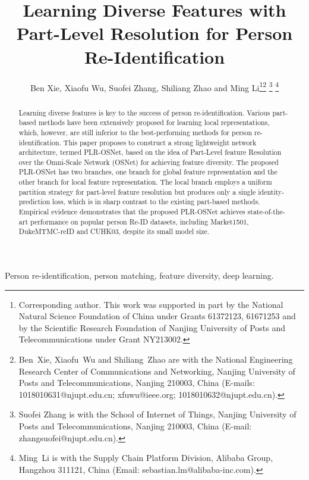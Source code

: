 \documentclass[journal]{IEEEtran}
\begin{document}
\title{Learning Diverse Features with Part-Level Resolution for Person Re-Identification}
\author{Ben Xie, Xiaofu Wu, Suofei Zhang, Shiliang Zhao and Ming Li\thanks{Corresponding author. This work was supported in part by the National Natural Science Foundation of China under Grants 61372123, 61671253 and by the Scientific Research Foundation of Nanjing University of Posts and Telecommunications under Grant NY213002.}\thanks{Ben~Xie, Xiaofu~Wu and Shiliang~Zhao are with the National Engineering Research Center of Communications and Networking, Nanjing University of Posts and Telecommunications, Nanjing 210003, China (E-mails: 1018010631@njupt.edu.cn; xfuwu@ieee.org; 1018010632@njupt.edu.cn).}
\thanks{Suofei Zhang is with the School of Internet of Things, Nanjing University of Posts and Telecommunications, Nanjing 210003, China (E-mail: zhangsuofei@njupt.edu.cn).}
\thanks{Ming~Li is with the Supply Chain Platform Division, Alibaba Group, Hangzhou 311121, China
(Email: sebastian.lm@alibaba-inc.com).}}

\maketitle

\begin{abstract}
   Learning diverse features is key to the success of person re-identification. Various part-based methods have been extensively proposed for learning local representations, which, however, are still inferior to the best-performing methods for person re-identification. This paper proposes to construct a strong lightweight network architecture, termed PLR-OSNet, based on the idea of Part-Level feature Resolution over the Omni-Scale Network (OSNet) for achieving feature diversity. The proposed PLR-OSNet has two branches, one branch for global feature representation and the other branch for local feature representation. The local branch employs a uniform partition strategy for part-level feature resolution but produces only a single identity-prediction loss, which is in sharp contrast to the existing part-based methods.  Empirical evidence demonstrates that the proposed PLR-OSNet achieves state-of-the-art performance on popular person Re-ID datasets, including Market1501, DukeMTMC-reID and CUHK03, despite its small model size.
\end{abstract}

\begin{IEEEkeywords}
Person re-identification, person matching, feature diversity, deep learning.
\end{IEEEkeywords}
\end{document}
